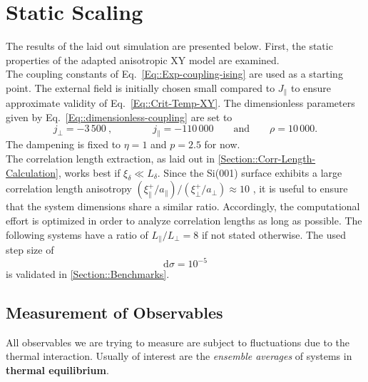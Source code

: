 	\section{Static Scaling}
 	The results of the laid out simulation are presented below. First, the static properties of the adapted anisotropic XY model are examined. \\
	
	The coupling constants of Eq.~\eqref{Eq::Exp-coupling-ising} are used as a starting point.
	 The external field is initially chosen small compared to $J_\parallel$ to ensure approximate validity of Eq.~\eqref{Eq::Crit-Temp-XY}. The dimensionless parameters given by Eq.~\eqref{Eq::dimensionless-coupling} are set to
	\begin{equation} \label{Eq::standard-parameters}
		j_\perp =	-3\,500~, \qquad \qquad j_\parallel =	-110\,000 \qquad \text{and} \qquad \rho =	10\,000.
	\end{equation}
	The dampening is fixed to $\eta =	1$ and $p=2.5$ for now. \\
	
	The correlation length extraction, as laid out in \autoref{Section::Corr-Length-Calculation}, works best if $\xi_\delta \ll L_\delta$. Since the Si(001) surface exhibits a large correlation length anisotropy ${(\xi^+_\parallel /	a_\parallel)} /	{(\xi^+_\perp /	a_\perp)} \approx 10 $ \cite{brand2023critical}, it is useful to ensure that the system dimensions share a similar ratio. Accordingly, the computational effort is optimized in order to analyze correlation lengths as long as possible. The following systems have a ratio of ${L_\parallel} /	{L_\perp} =	8$ if not stated otherwise. The used step size of
	\begin{equation}
		\text{d}\sigma = 10^{-5}
	\end{equation}
	is validated in \autoref{Section::Benchmarks}.
	
	
	
	\subsection{Measurement of Observables} \label{Section::observable-measurement}
	All observables we are trying to measure are subject to fluctuations due to the thermal interaction. Usually of interest are the \textit{ensemble averages} of systems in \textbf{thermal equilibrium}. \\
	
